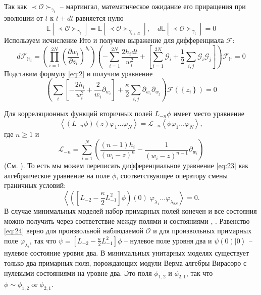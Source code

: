 Так как $ \prec\mathcal{O}\succ_{\gamma_{t}}$ --  мартингал, математическое ожидание его приращения при эволюции от  $t$ к $t+dt$ равняется нулю
\begin{equation}
  \mathbb{E}\left[\prec\mathcal{O}\succ_{\gamma_{t}}\right]=    \mathbb{E}\left[\prec\mathcal{O}\succ_{\gamma_{t+dt}}\right], \quad d\mathbb{E}\left[ \prec\mathcal{O}\succ_{\gamma_{t}}\right]=0
\label{eq:22}
\end{equation}
Используем исчисление Ито и получим выражение для дифференциала $\mathcal{F}$:
\begin{equation}
d \mathcal{F}_{\mathbb{H}_{t}}= \left(\prod_{i=1}^{2N}\left(\frac{\partial w_{i}}{\partial z_{i}}\right)^{h_{i}}\right)\left(-\sum_{i=1}^{2N}\frac{2h_{i}dt}{w_{i}^{2}}+\left[\sum_{i=1}^{2N}\mathcal{G}_{i}+\frac{1}{2}
      \sum_{i,j}\mathcal{G}_{i}\mathcal{G}_{j}\right]\right)\mathcal{F}_{\mathbb{H}}=0
\label{eq:8}
\end{equation}
Подставим формулу \eqref{eq:2} и получим уравнение
\begin{equation}
  \left( \sum_{i}\left[-\frac{2h_{i}}{w_{i}^{2}} +\frac{2}{w_{i}}\partial_{w_{i}}\right]+\frac{\kappa}{2}\sum_{i,j}\partial_{w_{i}} \partial_{w_{j}}\right)\mathcal{F}(\left\{z_{i}\right\})=0
\label{eq:23}
\end{equation}

Для корреляционных функций вторичных полей  $L_{-n}\phi$ имеет место уравнение
\begin{equation}
\left< (L_{-n}\phi)(z) \varphi_{1}\dots \varphi_{N}\right>=\mathcal{L}_{-n}\left<\phi\varphi_{1}\dots\varphi_{N}\right>,
\end{equation}
где $n\geq 1$ и
\begin{equation*}
  \mathcal{L}_{-n}=\sum_{i=1}^{N} \left(\frac{(n-1)h_{i}}{(w_{i}-z)^{n}} -\frac{1}{(w_{i}-z)^{n-1}}\partial_{w_{i}}\right)
\end{equation*}
(См. \cite{difrancesco1997cft}). То есть мы можем переписать дифференциальное уравнение \eqref{eq:23} как алгебраическое уравнение на поле $\phi$, соответствующее оператору смены граничных условий:
\begin{equation}
  \label{eq:24}
   \left<\left([L_{-2}-\frac{\kappa}{2}L_{-1}^{2}]\phi\right)(0)\; \varphi_{\lambda_{1}}\dots \varphi_{\lambda_{{2N}}}\right>=0.
\end{equation}
В случае минимальных моделей набор примарных полей конечен и все состояния можно получить через соответствие между полями и состояниями
\cite{belavin1984ics}, \cite{difrancesco1997cft}. 
Равенство \eqref{eq:24} верно для произвольной наблюдаемой $\mathcal{O}$ и для произвольных примарных поле $\varphi_{\lambda_{i}}$, так что $\psi=[L_{-2}-\frac{\kappa}{2}L_{-1}^{2}]\phi$ -- нулевое поле уровня два и $\psi(0)\left|0\right>$ -- нулевое состояние уровня два. В минимальных унитарных моделях существует только два примарных поля, порождающих модули Верма алгебры Вирасоро с нулевыми состояниями на уровне два. Это поля $\phi_{1,2}$ и $\phi_{2,1}$, так что $\phi\sim \phi_{1,2} \;\text{or}\; \phi_{2,1}$. 

